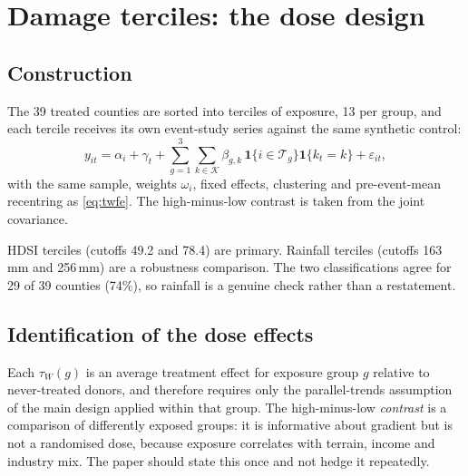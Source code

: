 \documentclass[11pt,a4paper]{article}
\newcommand{\Tr}{\mathcal{T}}
\newcommand{\ind}{\mathbf{1}}
\begin{document}
\section{Damage terciles: the dose design}\label{sec:dose}

\subsection{Construction}
The 39 treated counties are sorted into terciles of exposure, 13 per group, and each tercile receives
its own event-study series against the same synthetic control:
\begin{equation}
y_{it}=\alpha_i+\gamma_t+\sum_{g=1}^{3}\sum_{k\in\mathcal{K}}\beta_{g,k}\,\ind\{i\in\Tr_g\}\ind\{k_t=k\}+\varepsilon_{it},
\end{equation}
with the same sample, weights $\omega_i$, fixed effects, clustering and pre-event-mean recentring as
\eqref{eq:twfe}. The high-minus-low contrast is taken from the joint covariance.

HDSI terciles (cutoffs 49.2 and 78.4) are primary. Rainfall terciles (cutoffs 163\,mm and 256\,mm) are
a robustness comparison. The two classifications agree for 29 of 39 counties (74\%), so rainfall is a
genuine check rather than a restatement.

\subsection{Identification of the dose effects}
Each $\tau_W(g)$ is an average treatment effect for exposure group $g$ relative to never-treated
donors, and therefore requires only the parallel-trends assumption of the main design applied within
that group. The high-minus-low \emph{contrast} is a comparison of differently exposed groups: it is
informative about gradient but is not a randomised dose, because exposure correlates with terrain,
income and industry mix. The paper should state this once and not hedge it repeatedly.
\end{document}
